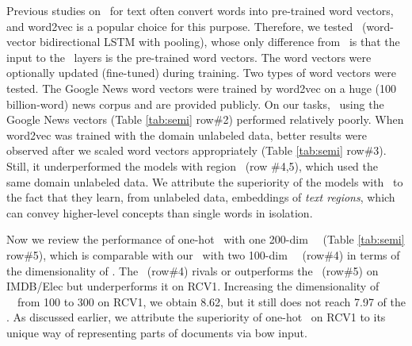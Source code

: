 \documentclass{article}
\begin{document}
Previous studies on \lstm\ for text often convert words into pre-trained word vectors, 
and word2vec \cite{wvecNips13}
is a popular choice for this purpose. 
Therefore, we tested \wvBiLstm\ (word-vector bidirectional LSTM with pooling), 
whose only difference from \ohBiLstm\ is that the input to the \lstm\ layers is 
the pre-trained word vectors. 
The word vectors were optionally updated (fine-tuned) during training. 
Two types of word vectors were tested.  
The Google News word vectors were trained by word2vec on a huge (100 billion-word) news corpus 
and are provided publicly. 
On our tasks, \wvBiLstm\ using the Google News vectors (Table \ref{tab:semi} row\#2) performed relatively poorly. 
When word2vec was trained with the domain unlabeled data, better results were observed
after we scaled word vectors appropriately (Table \ref{tab:semi} row\#3). 
Still, it underperformed 
the models with region \tvEmbs\ (row \#4,5), 
which used the same domain unlabeled data. We attribute 
the superiority of the models with \tvEmbs\ 
to the fact that they learn, from unlabeled data, 
embeddings of {\em text regions}, which can convey higher-level concepts than single words in isolation. 

Now we review the performance of one-hot \cnn\ 
with one 200-dim \cnn\ \tvEmb\ (Table \ref{tab:semi} row\#5), 
which is comparable with
our \lstm\ 
with two 100-dim \lstm\ \tvEmbs\ (row\#4)
in terms of the dimensionality of \tvEmbs.  
The \lstm\ 
(row\#4) rivals or outperforms 
the \cnn\ 
(row\#5) on IMDB/Elec 
but underperforms it on RCV1.  Increasing the dimensionality of \lstm\ \tvEmbs\ from 
100 to 300 on RCV1, we obtain 8.62, but it still does not reach 7.97 of 
the \cnn. 
As discussed earlier, we attribute the superiority of 
one-hot \cnn\ 
on RCV1 
to its unique way of representing parts of documents via bow input.
\end{document}
